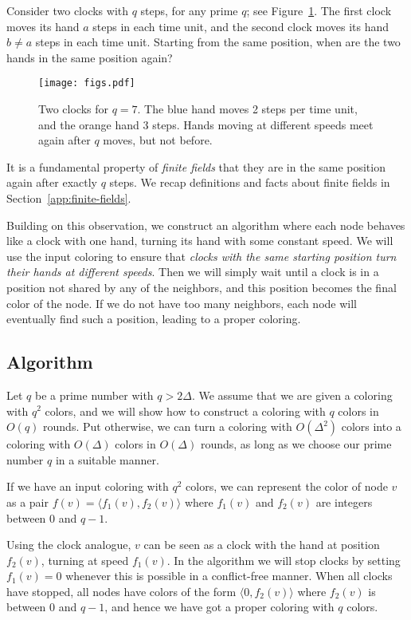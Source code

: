 Consider two clocks with $q$ steps, for any prime $q$; see Figure~\ref{fig:clocks}. The first clock moves its hand $a$ steps in each time unit, and the second clock moves its hand $b \neq a$ steps in each time unit. Starting from the same position, when are the two hands in the same position again?

\begin{figure}
    \centering
    \texttt{[image: figs.pdf]}
    \caption{Two clocks for $q=7$. The blue hand moves 2 steps per time unit, and the orange hand 3 steps. Hands moving at different speeds meet again after $q$ moves, but not before.}\label{fig:clocks}
\end{figure}

It is a fundamental property of \emph{finite fields} that they are in the same position again after exactly $q$ steps. We recap definitions and facts about finite fields in Section~\ref{app:finite-fields}.

Building on this observation, we construct an algorithm where each node behaves like a clock with one hand, turning its hand with some constant speed. We will use the input coloring to ensure that \emph{clocks with the same starting position turn their hands at different speeds}. Then we will simply wait until a clock is in a position not shared by any of the neighbors, and this position becomes the final color of the node. If we do not have too many neighbors, each node will eventually find such a position, leading to a proper coloring.

\subsection{Algorithm}\label{sec:additive-group-col-alg}

Let $q$ be a prime number with $q > 2\Delta$. We assume that we are given a coloring with $q^2$ colors, and we will show how to construct a coloring with $q$ colors in $O(q)$ rounds. Put otherwise, we can turn a coloring with $O(\Delta^2)$ colors into a coloring with $O(\Delta)$ colors in $O(\Delta)$ rounds, as long as we choose our prime number $q$ in a suitable manner.

If we have an input coloring with $q^2$ colors, we can represent the color of node $v$ as a pair $f(v) = \langle f_1(v), f_2(v) \rangle$ where $f_1(v)$ and $f_2(v)$ are integers between $0$ and $q-1$.

Using the clock analogue, $v$ can be seen as a clock with the hand at position $f_2(v)$, turning at speed $f_1(v)$. In the algorithm we will stop clocks by setting $f_1(v) = 0$ whenever this is possible in a conflict-free manner. When all clocks have stopped, all nodes have colors of the form $\langle 0, f_2(v) \rangle$ where $f_2(v)$ is between $0$ and $q-1$, and hence we have got a proper coloring with $q$ colors.

